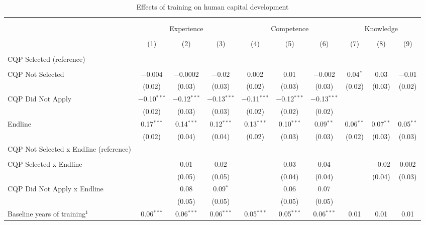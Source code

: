 \documentclass[
  11pt,
a4paper
]{report}
\begin{document}
\begin{adjustbox}{center}

\begin{table}[H] \centering 
  \caption{Effects of training on human capital development} 
  \label{tab:tbl-appreg} 
\scriptsize 
\begin{tabular}{@{\extracolsep{-8pt}}lccccccccc} 
\\[-1.8ex]\hline 
\hline \\[-1.8ex] 
\\[-1.8ex] & \multicolumn{3}{c}{Experience} & \multicolumn{3}{c}{Competence} & \multicolumn{3}{c}{Knowledge} \\ 
\\[-1.8ex] & (1) & (2) & (3) & (4) & (5) & (6) & (7) & (8) & (9)\\ 
\hline \\[-1.8ex] 
 CQP Selected (reference) \\ \\ CQP Not Selected & $-$0.004 & $-$0.0002 & $-$0.02 & 0.002 & 0.01 & $-$0.002 & 0.04$^{*}$ & 0.03 & $-$0.01 \\ 
  & (0.02) & (0.03) & (0.03) & (0.02) & (0.03) & (0.03) & (0.02) & (0.03) & (0.02) \\ 
  CQP Did Not Apply & $-$0.10$^{***}$ & $-$0.12$^{***}$ & $-$0.13$^{***}$ & $-$0.11$^{***}$ & $-$0.12$^{***}$ & $-$0.13$^{***}$ &  &  &  \\ 
  & (0.02) & (0.03) & (0.03) & (0.02) & (0.02) & (0.02) &  &  &  \\ 
  Endline & 0.17$^{***}$ & 0.14$^{***}$ & 0.12$^{***}$ & 0.13$^{***}$ & 0.10$^{***}$ & 0.09$^{**}$ & 0.06$^{**}$ & 0.07$^{**}$ & 0.05$^{**}$ \\ 
  & (0.02) & (0.04) & (0.04) & (0.02) & (0.03) & (0.03) & (0.02) & (0.03) & (0.03) \\ 
  CQP Not Selected x Endline (reference) \\ \\ CQP Selected x Endline &  & 0.01 & 0.02 &  & 0.03 & 0.04 &  & $-$0.02 & 0.002 \\ 
  &  & (0.05) & (0.05) &  & (0.04) & (0.04) &  & (0.04) & (0.03) \\ 
  CQP Did Not Apply x Endline &  & 0.08 & 0.09$^{*}$ &  & 0.06 & 0.07 &  &  &  \\ 
  &  & (0.05) & (0.05) &  & (0.05) & (0.05) &  &  &  \\ 
  Baseline years of training$^1$ & 0.06$^{***}$ & 0.06$^{***}$ & 0.06$^{***}$ & 0.05$^{***}$ & 0.05$^{***}$ & 0.06$^{***}$ & 0.01 & 0.01 & 0.01 \\ 

\end{tabular}
\end{table}
\end{adjustbox}
\end{document}
